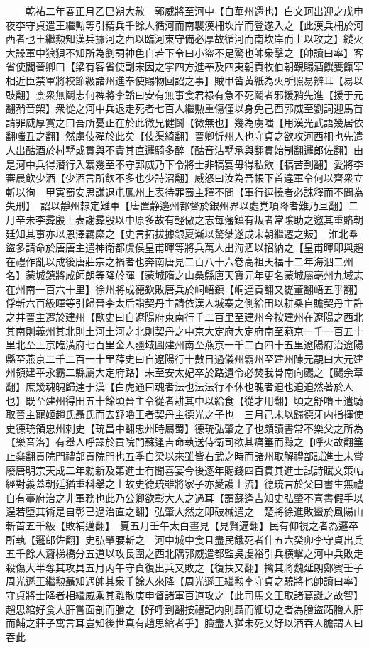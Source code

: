 　　乾祐二年春正月乙巳朔大赦　郭威將至河中【自華州還也】白文珂出迎之戊申夜李守貞遣王繼勲等引精兵千餘人循河而南襲漢柵坎岸而登遂入之【此漢兵柵於河西者也王繼勲知漢兵據河之西以臨河東守備必厚故循河而南坎岸而上以攻之】縱火大譟軍中狼狽不知所為劉詞神色自若下令曰小盜不足驚也帥衆擊之【帥讀曰率】客省使閻晉卿曰【梁有客省使副宋因之掌四方進奉及四夷朝貢牧伯朝覲賜酒饌甕餼宰相近臣禁軍將校節級諸州進奉使賜物回詔之事】賊甲皆黄紙為火所照易辨耳【易以䜴翻】柰衆無鬬志何禆將李韜曰安有無事食君禄有急不死鬬者邪援矟先進【援于元翻矟音槊】衆從之河中兵退走死者七百人繼勲重傷僅以身免己酉郭威至劉詞迎馬首請罪威厚賞之曰吾所憂正在於此微兄健鬬【微無也】幾為虜嗤【用漢光武語幾居依翻嗤丑之翻】然虜伎殫於此矣【伎渠綺翻】晉卿忻州人也守貞之欲攻河西柵也先遣人出酤酒於村墅或貫與不責其直邏騎多醉【酤音沽墅承與翻貫始制翻邏郎佐翻】由是河中兵得潜行入寨幾至不守郭威乃下令將士非犒宴毋得私飲【犒苦到翻】愛將李審晨飲少酒【少酒言所飲不多也少詩沼翻】威怒曰汝為吾帳下首違軍令何以齊衆立斬以徇　甲寅蜀安思謙退屯鳳州上表待罪蜀主釋不問【軍行逗撓者必誅釋而不問為失刑】　詔以靜州隸定難軍【唐置静邉州都督於銀州界以處党項降者難乃旦翻】二月辛未李彛殷上表謝彛殷以中原多故有輕傲之志每藩鎮有叛者常隂助之邀其重賂朝廷知其事亦以恩澤羈縻之【史言拓拔據銀夏漸以驁桀遂成宋朝繼遷之叛】　淮北羣盜多請命於唐唐主遣神衛都虞侯皇甫暉等將兵萬人出海泗以招納之【皇甫暉即與趙在禮作亂以成後唐莊宗之禍者也奔南唐見二百八十六卷高祖天福十二年海泗二州名】蒙城鎮將咸師朗等降於暉【蒙城隋之山桑縣唐天寶元年更名蒙城屬亳州九域志在州南一百六十里】徐州將成德欽敗唐兵於峒峿鎮【峒達貢翻又嵸董翻峿五乎翻】俘斬六百級暉等引歸晉李太后詣契丹主請依漢人城寨之側給田以耕桑自贍契丹主許之并晉主遷於建州【歐史曰自遼陽府東南行千二百里至建州今按建州在遼陽之西北其南則義州其北則土河土河之北則契丹之中京大定府大定府南至燕京一千一百五十里北至上京臨潢府七百里金人疆域圖建州南至燕京一千二百四十五里遼陽府治遼陽縣至燕京二千二百一十里薛史曰自遼陽行十數日過儀州霸州至建州陳元靚曰大元建州領建平永霸二縣屬大定府路】未至安太妃卒於路遺令必焚我骨南向颺之【颺余章翻】庶幾魂魄歸達于漢【白虎通曰魂者沄也沄沄行不休也魄者迫也迫迫然著於人也】既至建州得田五十餘頃晉主令從者耕其中以給食【從才用翻】頃之舒嚕王遣騎取晉主寵姬趙氏聶氏而去舒嚕王者契丹主德光之子也　三月己未以歸德牙内指揮使史德珫領忠州刺史【珫昌中翻忠州時屬蜀】德珫弘肇之子也頗讀書常不樂父之所為【樂音洛】有舉人呼譟於貢院門蘇逢吉命執送侍衛司欲其痛箠而黥之【呼火故翻箠止橤翻貢院門禮部貢院門也五季自梁以來雖皆右武之時而諸州取解禮部試進士未嘗廢唐明宗天成二年勑新及第進士有聞喜宴今後逐年賜錢四百貫其進士試詩賦文策帖經對義蓋朝廷猶重科舉之士故史德珫雖將家子亦愛護士流】德珫言於父曰書生無禮自有臺府治之非軍務也此乃公卿欲彰大人之過耳【謂蘇逢吉知史弘肇不喜書假手以逞若堕其術是自彰已過治直之翻】弘肇大然之即破械遣之　楚將徐進敗蠻於風陽山斬首五千級【敗補邁翻】　夏五月壬午太白晝見【見賢遍翻】民有仰視之者為邏卒所執【邏郎佐翻】史弘肇腰斬之　河中城中食且盡民餓死者什五六癸卯李守貞出兵五千餘人齎梯橋分五道以攻長圍之西北隅郭威遣都監吳䖍裕引兵横擊之河中兵敗走殺傷大半奪其攻具五月丙午守貞復出兵又敗之【復扶又翻】擒其將魏延朗鄭賓壬子周光遜王繼勲聶知遇帥其衆千餘人來降【周光遜王繼勲李守貞之驍將也帥讀曰率】守貞將士降者相繼威乘其離散庚申督諸軍百道攻之【此司馬文王取諸葛誕之故智】趙思綰好食人肝嘗面剖而膾之【好呼到翻按禮記内則聶而細切之者為膾盜跖膾人肝而餔之莊子寓言耳豈知後世真有趙思綰者乎】膾盡人猶未死又好以酒吞人膽謂人曰吞此